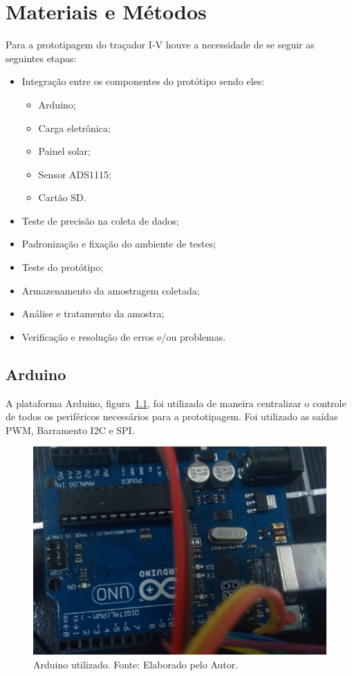 \chapter{Materiais e Métodos}
\label{cap:03}

Para a prototipagem do traçador I-V houve a necessidade de se seguir as seguintes etapas:
\begin{itemize}
	\item Integração entre os componentes do protótipo sendo eles:
	\begin{itemize} 
		\item Arduino;
		\item Carga eletrônica;
		\item Painel solar;
		\item Sensor ADS1115;
		\item Cartão SD.
	\end{itemize}
	\item Teste de precisão na coleta de dados;
	\item Padronização e fixação do ambiente de testes;
	\item Teste do protótipo;
	\item Armazenamento da amostragem coletada;
	\item Análise e tratamento da amostra;
	\item Verificação e resolução de erros e/ou problemas.

\end{itemize}

\section{Arduino}
A plataforma Arduino, figura~\ref{fig:CircuitoDuino}, foi utilizada de maneira centralizar o controle de todos os periféricos necessários para a prototipagem. Foi utilizado as saídas PWM, Barramento I2C e SPI.

\FloatBarrier
\begin{figure}[!htbp]
	\centering
	\includegraphics[scale=0.3]{imagens/ArduinoLigacoes.jpg}
	\caption{Arduino utilizado. Fonte: Elaborado pelo Autor. 	}
	\label{fig:CircuitoDuino}
\end{figure}
\FloatBarrier

